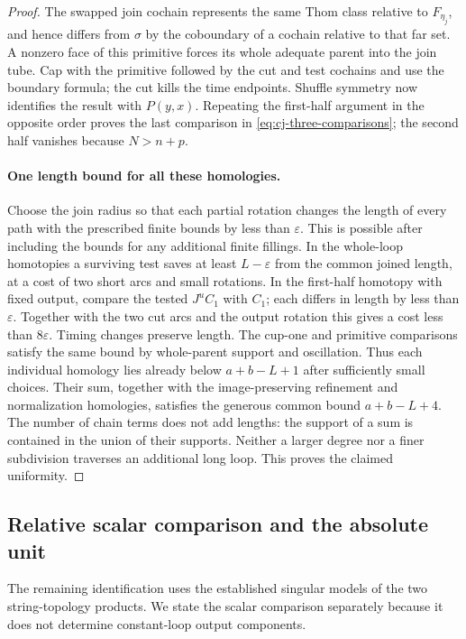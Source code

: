 \begin{proof}
The swapped join cochain represents the same Thom class relative
to $F_{\eta_j}$, and hence differs from $\sigma$ by the
coboundary of a cochain relative to that far set.  A nonzero
face of this primitive forces its whole adequate parent into
the join tube.  Cap with the primitive followed by the cut and
test cochains and use the boundary formula; the cut kills the
time endpoints.  Shuffle symmetry now identifies the result
with $P(y,x)$.  Repeating the first-half argument in the
opposite order proves the last comparison in
\eqref{eq:cj-three-comparisons}; the second half vanishes
because $N>n+p$.

\paragraph{One length bound for all these homologies.}
Choose the join radius so that each partial rotation changes
the length of every path with the prescribed finite bounds by
less than $\varepsilon$.  This is possible after including
the bounds for any additional finite fillings.  In the whole-loop
homotopies a surviving test saves at least $L-\varepsilon$
from the common joined length, at a cost of two short arcs and
small rotations.  In the first-half homotopy with fixed output,
compare the tested $J^u C_1$ with $C_1$; each differs in length
by less than $\varepsilon$.  Together with the two cut arcs
and the output rotation this gives a cost less than
$8\varepsilon$.  Timing changes preserve length.  The cup-one
and primitive comparisons satisfy the same bound by whole-parent
support and oscillation.  Thus each individual homology lies
already below $a+b-L+1$ after sufficiently small choices.
Their sum, together with the image-preserving refinement and
normalization homologies, satisfies the generous common bound
$a+b-L+4$.  The number of chain terms does not add lengths:
the support of a sum is contained in the union of their supports.
Neither a larger degree nor a finer subdivision traverses an
additional long loop.  This proves the claimed uniformity.
\end{proof}

\subsection{Relative scalar comparison and the absolute unit}

The remaining identification uses the established singular models
of the two string-topology products.  We state the scalar comparison
separately because it does not determine constant-loop output
components.

